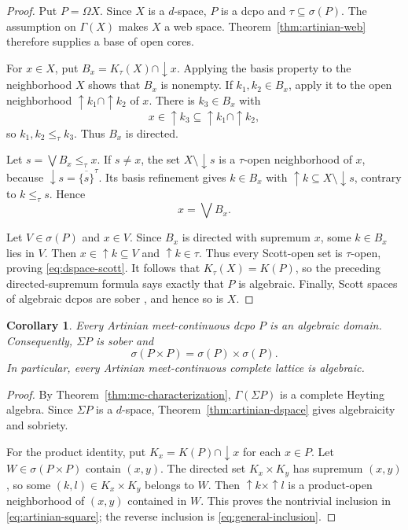 \documentclass[11pt,reqno]{amsart}
\newtheorem{corollary}[theorem]{Corollary}
\theoremstyle{definition}
\numberwithin{equation}{section}
\begin{document}
\begin{proof}
Put $P=\Omega X$. Since $X$ is a $d$-space, $P$ is a dcpo and
$\tau\subseteq\sigma(P)$. The assumption on $\Gamma(X)$ makes $X$
a web space. Theorem~\ref{thm:artinian-web} therefore supplies a base
of open cores.

For $x\in X$, put $B_x=K_\tau(X)\cap{\downarrow} x$. Applying the
basis property to the neighborhood $X$ shows that $B_x$ is nonempty.
If $k_1,k_2\in B_x$, apply it to the open neighborhood
${\uparrow} k_1\cap{\uparrow} k_2$ of $x$. There is $k_3\in B_x$ with
\[
  x\in{\uparrow} k_3\subseteq{\uparrow} k_1\cap{\uparrow} k_2,
\]
so $k_1,k_2\leq_\tau k_3$. Thus $B_x$ is directed.

Let $s=\bigvee B_x\leq_\tau x$. If $s\ne x$, the set
$X\setminus{\downarrow} s$ is a $\tau$-open neighborhood of $x$,
because ${\downarrow} s=\overline{\{s\}}^{\tau}$. Its basis refinement
gives $k\in B_x$ with
${\uparrow} k\subseteq X\setminus{\downarrow} s$, contrary to $k\leq_\tau s$.
Hence
\[
  x=\bigvee B_x.
\]

Let $V\in\sigma(P)$ and $x\in V$. Since $B_x$ is directed with
supremum $x$, some $k\in B_x$ lies in $V$. Then
$x\in{\uparrow} k\subseteq V$ and ${\uparrow} k\in\tau$. Thus every
Scott-open set is $\tau$-open, proving \eqref{eq:dspace-scott}.
It follows that $K_\tau(X)=K(P)$, so the preceding directed-supremum
formula says exactly that $P$ is algebraic. Finally, Scott spaces of
algebraic dcpos are sober \citep{GierzEtAl2003}, and hence so is $X$.
\end{proof}

\begin{corollary}\label{cor:artinian-mc}
Every Artinian meet-continuous dcpo $P$ is an algebraic domain.
Consequently, $\Sigma P$ is sober and
\begin{equation}\label{eq:artinian-square}
  \sigma(P\times P)=\sigma(P)\times\sigma(P).
\end{equation}
In particular, every Artinian meet-continuous complete lattice is
algebraic.
\end{corollary}

\begin{proof}
By Theorem~\ref{thm:mc-characterization}, $\Gamma(\Sigma P)$ is a
complete Heyting algebra. Since $\Sigma P$ is a $d$-space,
Theorem~\ref{thm:artinian-dspace} gives algebraicity and sobriety.

For the product identity, put $K_x=K(P)\cap{\downarrow} x$ for each
$x\in P$. Let $W\in\sigma(P\times P)$ contain $(x,y)$.
The directed set $K_x\times K_y$ has supremum $(x,y)$, so some
$(k,l)\in K_x\times K_y$ belongs to $W$. Then
${\uparrow} k\times{\uparrow} l$ is a product-open neighborhood of $(x,y)$
contained in $W$. This proves the nontrivial inclusion in
\eqref{eq:artinian-square}; the reverse inclusion is
\eqref{eq:general-inclusion}.
\end{proof}
\end{document}
